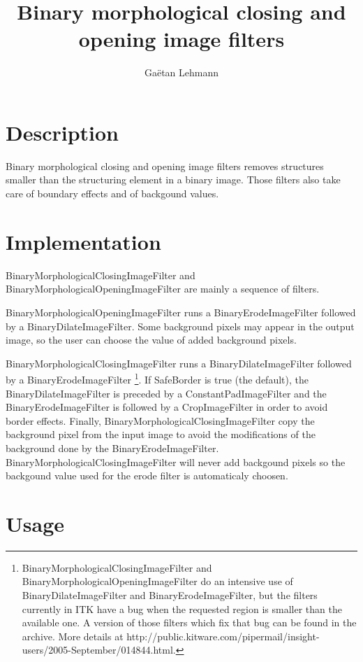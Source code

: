 \documentclass[IJ]{cesj}
\author{Ga\"etan Lehmann}
\institute{Biologie du d\'eveloppement et de la reproduction, INRA de Jouy-en-Josas}
\title{Binary morphological closing and opening image filters}
\begin{document}
\lstset{language=c++}
\maketitle

\section{Description}

Binary morphological closing and opening image filters removes structures smaller than the structuring element in a binary image. Those filters also take care of boundary effects and of backgound values.

\section{Implementation}

BinaryMorphologicalClosingImageFilter and BinaryMorphologicalOpeningImageFilter are mainly a sequence of filters.

BinaryMorphologicalOpeningImageFilter runs a BinaryErodeImageFilter followed by a BinaryDilateImageFilter. Some background pixels may appear in the output image, so the user can choose the value of added background pixels.

BinaryMorphologicalClosingImageFilter runs a BinaryDilateImageFilter followed by a BinaryErodeImageFilter \footnote{BinaryMorphologicalClosingImageFilter and BinaryMorphologicalOpeningImageFilter do an intensive use of BinaryDilateImageFilter and BinaryErodeImageFilter, but the filters currently in ITK have a bug when the requested region is smaller than the available one. A version of those filters which fix that bug can be found in the archive. More details at http://public.kitware.com/pipermail/insight-users/2005-September/014844.html.}. If SafeBorder is true (the default), the BinaryDilateImageFilter is preceded by a ConstantPadImageFilter and the BinaryErodeImageFilter is followed by a CropImageFilter in order to avoid border effects. Finally, BinaryMorphologicalClosingImageFilter copy the background pixel from the input image to avoid the modifications of the background done by the BinaryErodeImageFilter. BinaryMorphologicalClosingImageFilter will never add backgound pixels so the backgound value used for the erode filter is automaticaly choosen.

\section{Usage}
\end{document}

